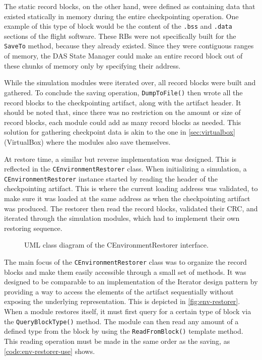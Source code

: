 {The static record blocks, on the other hand, were defined as containing data that existed statically in memory during the entire checkpointing operation. One example of this type of block would be the content of the \texttt{.bss} and \texttt{.data} sections of the flight software. These RBs were not specifically built for the \texttt{SaveTo} method, because they already existed. Since they were contiguous ranges of memory, the DAS State Manager could make an entire record block out of these chunks of memory only by specifying their address. 

While the simulation modules were iterated over, all record blocks were built and gathered. To conclude the saving operation, \texttt{DumpToFile()} then wrote all the record blocks to the checkpointing artifact, along with the artifact header. It should be noted that, since there was no restriction on the amount or size of record blocks, each module could add as many record blocks as needed. This solution for gathering checkpoint data is akin to the one in \autoref{sec:virtualbox} (VirtualBox) where the modules also save themselves.

At restore time, a similar but reverse implementation was designed. This is reflected in the \texttt{CEnvironmentRestorer} class. When initializing a simulation, a \texttt{CEnvironmentRestorer} instance started by reading the header of the checkpointing artifact. This is where the current  loading address was validated, to make sure it was loaded at the same address as when the checkpointing artifact was produced. The restorer then read the record blocks, validated their CRC, and iterated through the simulation modules, which had to implement their own restoring sequence.

\begin{figure}[htbp]
	\vspace{12pt}
	\centering
	\footnotesize
	
	\caption{UML class diagram of the CEnvironmentRestorer interface.}
	\label{fig:env-restorer}
\end{figure}

The main focus of the \texttt{CEnvironmentRestorer} class was to organize the record blocks and make them easily accessible through a small set of methods. It was designed to be comparable to an implementation of the Iterator design pattern by providing a way to access the elements of the artifact sequentially without exposing the underlying representation\cite{misc:iterator-des-pat}. This is depicted in \autoref{fig:env-restorer}. When a module restores itself, it must first query for a certain type of block via the \texttt{QueryBlockType()} method. The module can then read any amount of a defined type from the block by using the \texttt{ReadFromBlock()} template method. This reading operation must be made in the same order as the saving, as \autoref{code:env-restorer-use} shows.

}
